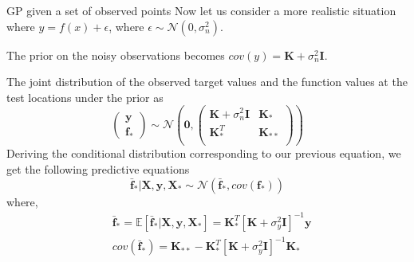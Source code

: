 \documentclass[10pt]{beamer}
\begin{document}
\begin{frame}{GP given a set of observed points}
	Now let us consider a more realistic situation where $y = f(x) + \epsilon$, where $\epsilon \sim \mathcal{N}(0, \sigma^2_n)$.
	
	The prior on the noisy observations becomes $cov(y) = \mathbf{K} + \sigma_n^2 \mathbf{I}$. 
	
	The joint distribution of the observed target values and the function values at the test locations under the prior as 
	$$\left(\begin{array}{r}
		\mathbf{y} \\ 
		\mathbf{f}_*
	\end{array}\right) \sim \mathcal{N} \left(\mathbf{0}, \left(\begin{array}{rr}
		\mathbf{K} + \sigma^2_n \mathbf{I}& \mathbf{K}_* \\ 
		\mathbf{K}_*^T& \mathbf{K}_{**} \\
	\end{array}\right)\right)$$
	Deriving the conditional distribution corresponding to our previous equation, we get the following predictive equations
	$$ \bar{\mathbf{f}} _*|\mathbf{X}, \mathbf{y}, \mathbf{X}_* \sim \mathcal{N} \left(\bar{\mathbf{f}}_*, cov(\mathbf{f}_*)\right) $$
	where, 
	\begin{align*}
		&\bar{\mathbf{f}}_*  = \mathbb{E} \left[ \bar{\mathbf{f}}_* | \mathbf{X}, \mathbf{y}, \mathbf{X}_*\right] = \mathbf{K}_*^T \left[\mathbf{K} + \sigma_y^2 \mathbf{I}\right]^{-1} \mathbf{y} \\ 
		&cov(\bar{\mathbf{f}}_*)  = \mathbf{K}_{**} - \mathbf{K}_*^T \left[\mathbf{K} + \sigma_y^2 \mathbf{I}\right]^{-1} \mathbf{K}_*
	\end{align*}
	
\end{frame}
\end{document}
